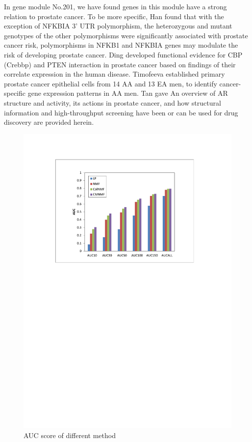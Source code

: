 \documentclass{bmcart}
\begin{document}
In gene module No.201, we have found genes in this module have a strong relation to prostate cancer. To be more specific, Han \cite{Han2015} found that with the exception of NFKBIA 3' UTR polymorphism, the heterozygous and mutant genotypes of the other polymorphisms were significantly associated with prostate cancer risk, polymorphisms in NFKB1 and NFKBIA genes may modulate the risk of developing prostate cancer. Ding \cite{Ding2014} developed functional evidence for CBP (Crebbp) and PTEN interaction in prostate cancer based on findings of their correlate expression in the human disease.  Timofeeva \cite{Timofeeva2009} established primary prostate cancer epithelial cells from 14 AA and 13 EA men, to identify cancer-specific gene expression patterns in AA men.
Tan \cite{Tan2015} gave An overview of AR structure and activity, its actions in prostate cancer, and how structural information and high-throughput screening have been or can be used for drug discovery are provided herein.
\begin{figure}[!h]
  \begin{minipage}[t]{0.9\linewidth}
    \includegraphics[width=\linewidth,origin = l]{DrawPictures/auc_excel.pdf}
  \end{minipage}
  \caption{AUC score of different method} \label{fig:AUC}
\end{figure}
\end{document}
